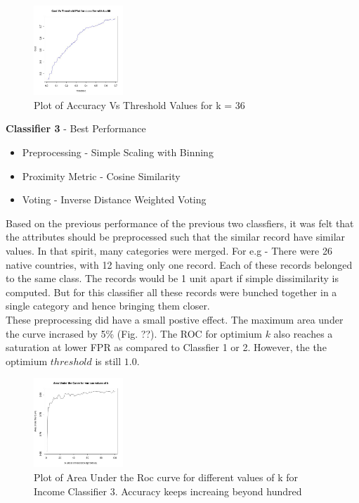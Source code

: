 	\begin{figure}
		\label{fig:classifier2_accuracy}
		\caption{Plot of Accuracy Vs Threshold Values for k = 36}
		\centering
		\includegraphics[width=0.3\textwidth]{images/income_classifier2/accuracy.jpg}
	\end{figure}
	
\textbf{Classifier 3} - Best Performance
	\begin{itemize}
		\item Preprocessing - Simple Scaling with Binning
		\item Proximity Metric - Cosine Similarity
		\item Voting - Inverse Distance Weighted Voting
	\end{itemize}
	Based on the previous performance of the previous two classfiers, it was felt that the attributes should be preprocessed such that the similar record have similar values. In that spirit, many categories were merged. For e.g - There were 26 native countries, with 12 having only one record. Each of these records belonged to the same class. The records would be 1 unit apart if simple dissimilarity is computed. But for this classifier all these records were bunched together in a single category and hence bringing them closer.\\
	These preprocessing did have a small postive effect. The maximum area under the curve incrased by 5\% (Fig. ??). The ROC for optimium $k$ also reaches a saturation at lower FPR as compared to Classfier 1 or 2. However, the the optimium $threshold$ is still $1.0$.\\
	\begin{figure}[h]
		\label{fig:classifier3_auc}
		\caption{Plot of Area Under the Roc curve for different values of k for Income Classifier 3. Accuracy keeps increaing beyond hundred}
		\centering
		\includegraphics[width=0.3\textwidth]{images/income_classifier3/auc.jpg}
	\end{figure}	
